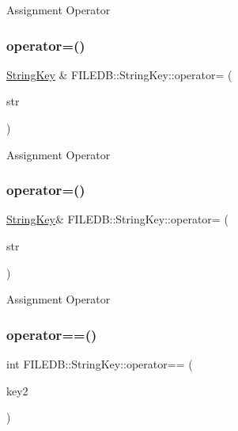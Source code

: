 Assignment Operator \mbox{\label{classFILEDB_1_1StringKey_a0d36351143904ce0b1b6716e4f95d8b5}} 
\subsubsection{\texorpdfstring{operator=()}{operator=()}\hspace{0.1cm}{\footnotesize\ttfamily [5/6]}}
{\footnotesize\ttfamily \mbox{\hyperlink{classFILEDB_1_1StringKey}{String\+Key}} \& F\+I\+L\+E\+D\+B\+::\+String\+Key\+::operator= (\begin{DoxyParamCaption}\item[{const std\+::string \&}]{str }\end{DoxyParamCaption})}

Assignment Operator \mbox{\label{classFILEDB_1_1StringKey_ad52c218455b3eb934a68f3d13ab6512e}} 
\subsubsection{\texorpdfstring{operator=()}{operator=()}\hspace{0.1cm}{\footnotesize\ttfamily [6/6]}}
{\footnotesize\ttfamily \mbox{\hyperlink{classFILEDB_1_1StringKey}{String\+Key}}\& F\+I\+L\+E\+D\+B\+::\+String\+Key\+::operator= (\begin{DoxyParamCaption}\item[{const std\+::string \&}]{str }\end{DoxyParamCaption})}

Assignment Operator \mbox{\label{classFILEDB_1_1StringKey_a75f2abcdf7d61bb860156f8758a56a1f}} 
\subsubsection{\texorpdfstring{operator==()}{operator==()}\hspace{0.1cm}{\footnotesize\ttfamily [1/3]}}
{\footnotesize\ttfamily int F\+I\+L\+E\+D\+B\+::\+String\+Key\+::operator== (\begin{DoxyParamCaption}\item[{const \mbox{\hyperlink{classFILEDB_1_1StringKey}{String\+Key}} \&}]{key2 }\end{DoxyParamCaption})}

